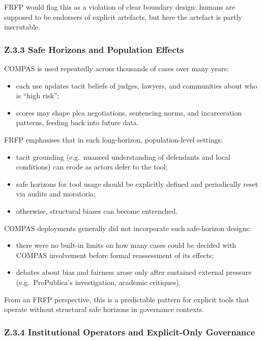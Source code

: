 FRFP would flag this as a violation of clear boundary design: humans are
supposed to be endorsers of explicit artefacts, but here the artefact is
partly inscrutable.

\subsubsection*{Z.3.3 Safe Horizons and Population Effects}

COMPAS is used repeatedly across thousands of cases over many years:

\begin{itemize}
  \item each use updates tacit beliefs of judges, lawyers, and communities
        about who is ``high risk'';
  \item scores may shape plea negotiations, sentencing norms, and incarceration
        patterns, feeding back into future data.
\end{itemize}

FRFP emphasises that in such long-horizon, population-level settings:

\begin{itemize}
  \item tacit grounding (e.g.\ nuanced understanding of defendants and local
        conditions) can erode as actors defer to the tool;
  \item safe horizons for tool usage should be explicitly defined and
        periodically reset via audits and moratoria;
  \item otherwise, structural biases can become entrenched.
\end{itemize}

COMPAS deployments generally did not incorporate such safe-horizon designs:

\begin{itemize}
  \item there were no built-in limits on how many cases could be decided with
        COMPAS involvement before formal reassessment of its effects;
  \item debates about bias and fairness arose only after sustained external
        pressure (e.g.\ ProPublica’s investigation, academic critiques).
\end{itemize}

From an FRFP perspective, this is a predictable pattern for explicit tools
that operate without structural safe horizons in governance contexts.

\subsubsection*{Z.3.4 Institutional Operators and Explicit-Only Governance}

